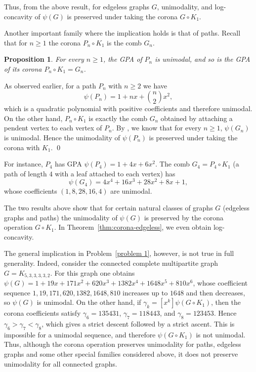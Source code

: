 \documentclass[12pt,twoside]{article}
\newtheorem{proposition}[theorem]{Proposition}
\renewenvironment{proof}{{\noindent\bfseries Proof.}}{\qed}
\begin{document}
	Thus, from the above result, for edgeless graphs $G$, unimodality, and log-concavity of
	$\psi(G)$ is preserved under taking the corona $G\circ K_1$.
	
	 Another important family where the implication holds is that of paths.
	Recall that for $n\ge 1$ the corona $P_n\circ K_1$ is the comb $G_n$.
	
	\begin{proposition}\label{prop:corona-path}
		For every $n\ge 1$, the GPA of $P_n$ is unimodal,
		and so is the GPA of its corona $P_n\circ K_1=G_n$.
	\end{proposition}
	
	\begin{proof}
		As observed earlier, for a path $P_n$ with $n\ge 2$ we have
		\cite[Proposition~2.1(ii)]{0}
		\[
		\psi(P_n) = 1 + nx + \binom{n}{2}x^2,
		\]
		which is a quadratic polynomial with positive coefficients and therefore
		unimodal. On the other hand, $P_n\circ K_1$ is exactly the comb $G_n$ obtained by
		attaching a pendent vertex to each vertex of $P_n$. By \cite[Theorem 4.1]{0}, we know
		that for every $n\ge 1$, $\psi(G_n)$ is unimodal. Hence the unimodality of
		$\psi(P_n)$ is preserved under taking the corona with $K_1$.
	\end{proof}
	
	For instance, $P_4$ has GPA $\psi(P_4) = 1 + 4x + 6x^2.$ The comb $G_4 = P_4\circ K_1$ (a path of length $4$ with a leaf attached to each vertex) has
		\[
		\psi(G_4) = 4x^4 + 16x^3 + 28x^2 + 8x + 1,
		\]
		 whose coefficients		$(1,8,28,16,4)$ are unimodal.
	
	 
	The two results above show that for certain natural classes of graphs $G$
	(edgeless graphs and paths) the unimodality of $\psi(G)$ is preserved by the
	corona operation $G\circ K_1$. In Theorem~\ref{thm:corona-edgeless}, we even
	obtain log-concavity. 
	\medskip
	
	The general implication in Problem~\ref{problem 1}, however, is not true in full generality. Indeed, consider the connected complete multipartite graph $G=K_{5,3,3,3,3,2}$. For this graph one obtains $\psi(G)=1+19x+171x^2+620x^3+1382x^4+1648x^5+810x^6$, whose coefficient sequence $1,19,171,620,1382,1648,810$ increases up to $1648$ and then decreases, so $\psi(G)$ is unimodal. On the other hand, if $\gamma_k=[x^k]\psi(G\circ K_1)$, then the corona coefficients satisfy $\gamma_6=135431$, $\gamma_7=118443$, and $\gamma_8=123453$. Hence $\gamma_6>\gamma_7<\gamma_8$, which gives a strict descent followed by a strict ascent. This is impossible for a unimodal sequence, and therefore $\psi(G\circ K_1)$ is not unimodal. Thus, although the corona operation preserves unimodality for paths, edgeless graphs and some other special families considered above, it does not preserve unimodality for all connected graphs.
	
\end{document}
